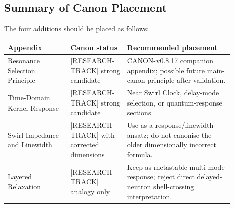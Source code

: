 \subsection*{Summary of Canon Placement}
    \label{app:canon-placement-summary}
    
    The four additions should be placed as follows:
    
    \begin{center}
        \begin{tabular}{|p{0.25\linewidth}|p{0.22\linewidth}|p{0.42\linewidth}|}
            \hline
            \textbf{Appendix} & \textbf{Canon status} & \textbf{Recommended placement} \\
            \hline
            Resonance Selection Principle &
            [RESEARCH-TRACK] strong candidate &
            CANON-v0.8.17 companion appendix; possible future main-canon principle after validation. \\
            \hline
            Time-Domain Kernel Response &
            [RESEARCH-TRACK] strong candidate &
            Near Swirl Clock, delay-mode selection, or quantum-response sections. \\
            \hline
            Swirl Impedance and Linewidth &
            [RESEARCH-TRACK] with corrected dimensions &
            Use as a response/linewidth ansatz; do not canonise the older dimensionally incorrect formula. \\
            \hline
            Layered Relaxation &
            [RESEARCH-TRACK] analogy only &
            Keep as metastable multi-mode response; reject direct delayed-neutron shell-crossing interpretation. \\
            \hline
        \end{tabular}
    \end{center}


